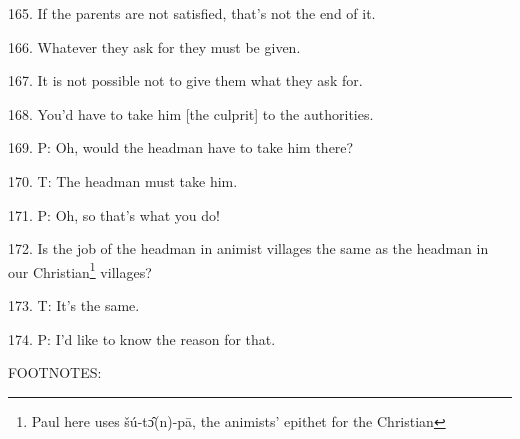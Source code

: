165. If the parents are not satisfied, that's not the end of it.

166. Whatever they ask for they must be given.

167. It is not possible not to give them what they ask for.

168. You'd have to take him [the culprit] to the authorities.

169. P: Oh, would the headman have to take him there?

170. T: The headman must take him.

171. P: Oh, so that's what you do!

172. Is the job of the headman in animist villages the same as the headman in our
Christian\footnote{Paul here uses šú-tɔ̂(n)-pā, the animists' epithet for the Christian} villages?

173. T: It's the same.

174. P: I'd like to know the reason for that.

FOOTNOTES:


